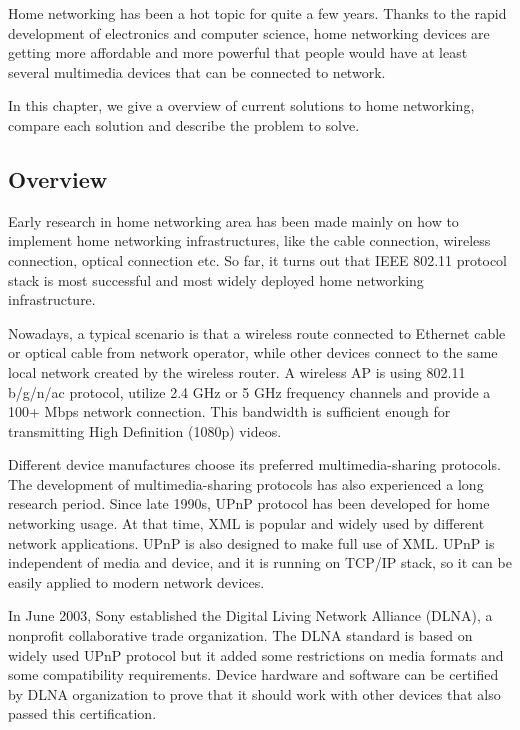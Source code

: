 
Home networking has been a hot topic for quite a few years. Thanks to the rapid development 
of electronics and computer science, home networking devices are getting more affordable 
and more powerful that people would have at least several multimedia devices that can be 
connected to network.

In this chapter, we give a overview of current solutions to home networking,
compare each solution and describe the problem to solve.

\subsection{Overview}
Early research \cite{link_layer_old} \cite{end_user} \cite{link_layer}
 in home networking area  has been made mainly on how to implement home
 networking infrastructures, like the cable connection, wireless connection,
 optical connection etc. So far, it turns out that IEEE 802.11 protocol stack
 is most successful and most widely deployed home networking infrastructure.

Nowadays, a typical scenario is that a wireless route connected to Ethernet
cable or optical cable from network operator, while other devices connect to
the same local network created by the wireless router. A wireless AP is using
802.11 b/g/n/ac protocol, utilize 2.4 GHz or 5 GHz frequency channels and
provide a 100+ Mbps network connection. This bandwidth is sufficient enough for
transmitting High Definition (1080p) videos.

Different device manufactures choose its preferred multimedia-sharing protocols. The development 
of multimedia-sharing protocols has also experienced a long research period. Since late 1990s, 
UPnP protocol has been developed for home networking usage. At that time, XML is popular and 
widely used by different network applications. UPnP is also designed to make full use of XML. 
UPnP is independent of media and device, and it is running on TCP/IP stack, so it can be easily 
applied to modern network devices. 

In June 2003, Sony established the Digital Living Network Alliance (DLNA), a nonprofit collaborative 
trade organization. The DLNA standard is based on widely used UPnP protocol but it added some 
restrictions on media formats and some compatibility requirements. Device hardware and software 
can be certified by DLNA organization to prove that it should work with other devices that also 
passed this certification.

